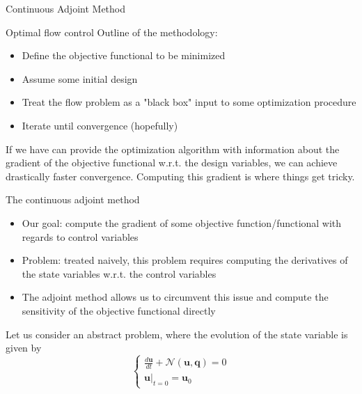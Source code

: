 \documentclass{beamer}
\begin{document}
\begin{frame}[standout]
    Continuous Adjoint Method
\end{frame}

\begin{frame}{Optimal flow control}
Outline of the methodology:
\begin{itemize}
\item Define the objective functional to be minimized
\item Assume some initial design
\item Treat the flow problem as a "black box" input to some optimization procedure
\item Iterate until convergence (hopefully)
\end{itemize}
If we have can provide the optimization algorithm with information about the gradient of the objective functional w.r.t. the design variables, we can achieve drastically faster convergence. Computing this gradient is where things get tricky.
\end{frame}

\begin{frame}{The continuous adjoint method}
	
	\begin{itemize}
		\item Our goal: compute the gradient of some objective function/functional with regards to control variables
		\item Problem: treated naively, this problem requires computing the derivatives of the state variables w.r.t. the control variables
		\item The adjoint method allows us to circumvent this issue and compute the sensitivity of the objective functional directly
	\end{itemize}
	Let us consider an abstract problem, where the evolution of the state variable is given by
	\begin{equation}
		\left\{ \begin{array}{c}
		\frac{d\mathbf{u}}{dt}+\mathbf{\mathcal{N}}\left(\mathbf{u},\mathbf{q}\right)=0\\
		\left.\mathbf{u}\right|_{t=0}=\mathbf{u}_{0}
		\end{array}\right.
	\end{equation}
	
\end{frame}
\end{document}
